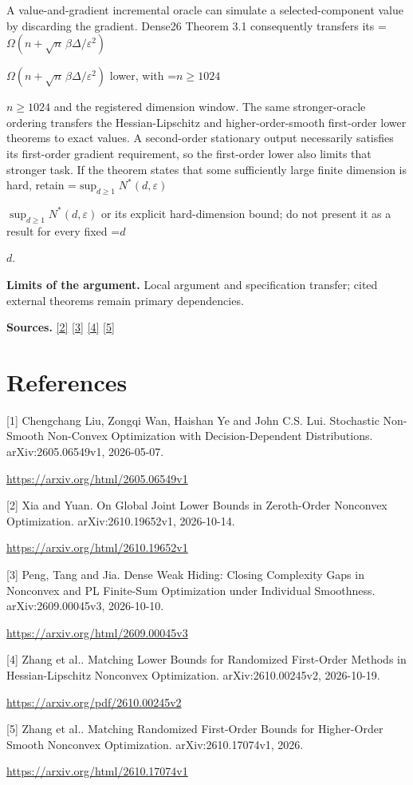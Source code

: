 \documentclass[10pt,a4paper]{article}
\newcommand{\AtlasMath}[1]{\par\begingroup\centering\setbox0=\hbox{$\displaystyle #1$}\ifdim\wd0>1.4\linewidth\typeout{ATLAS WIDE FORMULA: \the\wd0}\fi\ifdim\wd0>\linewidth\resizebox{\linewidth}{!}{\box0}\else\box0\fi\par\endgroup}
\newcommand{\AtlasInlineMath}[1]{\begingroup\setbox0=\hbox{$#1$}\ifdim\wd0>.4\linewidth\endgroup\AtlasMath{#1}\else\endgroup$#1$\fi}
\begin{document}
A value-and-gradient incremental oracle can simulate a selected-component value by discarding the gradient. Dense26 Theorem 3.1 consequently transfers its \AtlasInlineMath{\Omega(n+\sqrt n\,\beta\Delta/\varepsilon^2)} lower, with \AtlasInlineMath{n\ge1024} and the registered dimension window. The same stronger-oracle ordering transfers the Hessian-Lipschitz and higher-order-smooth first-order lower theorems to exact values. A second-order stationary output necessarily satisfies its first-order gradient requirement, so the first-order lower also limits that stronger task. If the theorem states that some sufficiently large finite dimension is hard, retain \AtlasInlineMath{\sup_{d\ge1}N^*(d,\varepsilon)} or its explicit hard-dimension bound; do not present it as a result for every fixed \AtlasInlineMath{d}.

\textbf{Limits of the argument.} Local argument and specification transfer; cited external theorems remain primary dependencies.

\textbf{Sources.} \href{https://arxiv.org/html/2610.19652v1}{[2]} \href{https://arxiv.org/html/2609.00045v3}{[3]} \href{https://arxiv.org/pdf/2610.00245v2}{[4]} \href{https://arxiv.org/html/2610.17074v1}{[5]}

\section{References}
[1] Chengchang Liu, Zongqi Wan, Haishan Ye and John C.S. Lui. Stochastic Non-Smooth Non-Convex Optimization with Decision-Dependent Distributions. arXiv:2605.06549v1, 2026-05-07.

\url{https://arxiv.org/html/2605.06549v1}

[2] Xia and Yuan. On Global Joint Lower Bounds in Zeroth-Order Nonconvex Optimization. arXiv:2610.19652v1, 2026-10-14.

\url{https://arxiv.org/html/2610.19652v1}

[3] Peng, Tang and Jia. Dense Weak Hiding: Closing Complexity Gaps in Nonconvex and PL Finite-Sum Optimization under Individual Smoothness. arXiv:2609.00045v3, 2026-10-10.

\url{https://arxiv.org/html/2609.00045v3}

[4] Zhang et al.. Matching Lower Bounds for Randomized First-Order Methods in Hessian-Lipschitz Nonconvex Optimization. arXiv:2610.00245v2, 2026-10-19.

\url{https://arxiv.org/pdf/2610.00245v2}

[5] Zhang et al.. Matching Randomized First-Order Bounds for Higher-Order Smooth Nonconvex Optimization. arXiv:2610.17074v1, 2026.

\url{https://arxiv.org/html/2610.17074v1}
\end{document}
